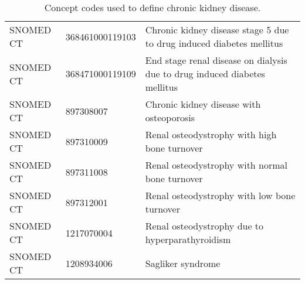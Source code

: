\begin{table}[ht]
\begin{tabular}{lll}
  SNOMED CT & 368461000119103 & Chronic kidney disease stage 5 due to drug induced diabetes mellitus \\ 
  SNOMED CT & 368471000119109 & End stage renal disease on dialysis due to drug induced diabetes mellitus \\ 
  SNOMED CT & 897308007 & Chronic kidney disease with osteoporosis \\ 
  SNOMED CT & 897310009 & Renal osteodystrophy with high bone turnover \\ 
  SNOMED CT & 897311008 & Renal osteodystrophy with normal bone turnover \\ 
  SNOMED CT & 897312001 & Renal osteodystrophy with low bone turnover \\ 
  SNOMED CT & 1217070004 & Renal osteodystrophy due to hyperparathyroidism \\ 
  SNOMED CT & 1208934006 & Sagliker syndrome \\ 
   \hline
\end{tabular}
\caption{Concept codes used to define chronic kidney disease.} 
\label{tab:codes_ckd}
\end{table}
